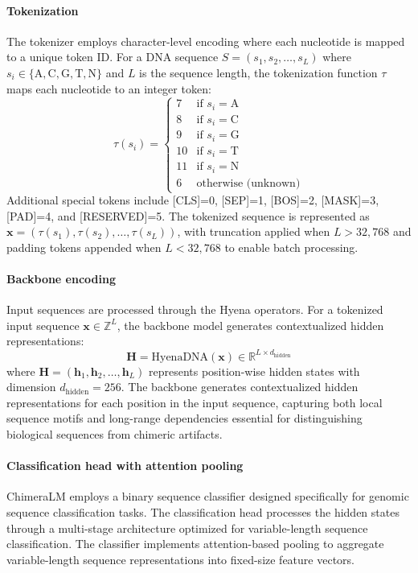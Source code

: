 \documentclass[pdflatex,sn-nature]{sn-jnl}%
\theoremstyle{thmstyleone}%
\theoremstyle{thmstyletwo}%
\theoremstyle{thmstylethree}%
\begin{document}
\paragraph{Tokenization}
The tokenizer employs character-level encoding where each nucleotide is mapped to a unique token ID.
For a DNA sequence $S = (s_1, s_2, \ldots, s_L)$ where $s_i \in \{\text{A}, \text{C}, \text{G}, \text{T}, \text{N}\}$ and $L$ is the sequence length, the tokenization function $\tau$ maps each nucleotide to an integer token:
$$
	\tau(s_i) = \begin{cases}
		7  & \text{if } s_i = \text{A}  \\
		8  & \text{if } s_i = \text{C}  \\
		9  & \text{if } s_i = \text{G}  \\
		10 & \text{if } s_i = \text{T}  \\
		11 & \text{if } s_i = \text{N}  \\
		6  & \text{otherwise (unknown)}
	\end{cases}
$$
Additional special tokens include [CLS]=0, [SEP]=1, [BOS]=2, [MASK]=3, [PAD]=4, and [RESERVED]=5.
The tokenized sequence is represented as $\mathbf{x} = (\tau(s_1), \tau(s_2), \ldots, \tau(s_L))$, with truncation applied when $L > 32{,}768$ and padding tokens appended when $L < 32{,}768$ to enable batch processing.

\paragraph{Backbone encoding}
Input sequences are processed through the Hyena operators.
For a tokenized input sequence $\mathbf{x} \in \mathbb{Z}^{L}$, the backbone model generates contextualized hidden representations:
$$
	\mathbf{H} = \text{HyenaDNA}(\mathbf{x}) \in \mathbb{R}^{L \times d_{\text{hidden}}}
$$
where $\mathbf{H} = (\mathbf{h}_1, \mathbf{h}_2, \ldots, \mathbf{h}_L)$ represents position-wise hidden states with dimension $d_{\text{hidden}} = 256$.
The backbone generates contextualized hidden representations for each position in the input sequence, capturing both local sequence motifs and long-range dependencies essential for distinguishing biological sequences from chimeric artifacts.

\paragraph{Classification head with attention pooling}
ChimeraLM employs a binary sequence classifier designed specifically for genomic sequence classification tasks.
The classification head processes the hidden states through a multi-stage architecture optimized for variable-length sequence classification.
The classifier implements attention-based pooling to aggregate variable-length sequence representations into fixed-size feature vectors.
\end{document}
